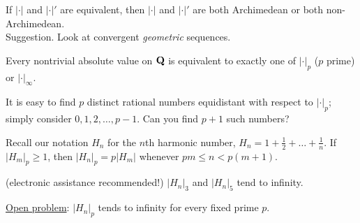 \begin{prob}\label{prob:48} If $|\cdot|$ and $|\cdot|'$ are equivalent, then $|\cdot|$ and $|\cdot|'$ are both Archimedean or both non-Archimedean.\\
{\scriptsize Suggestion. Look at convergent \emph{geometric} sequences.}
\end{prob} 


\begin{prob}\label{prob:49} Every nontrivial absolute value on $\mathbf{Q}$ is equivalent to exactly one of $|\cdot|_p$ ($p$ prime) or $|\cdot|_{\infty}$.
\end{prob} 




\begin{prob}\label{ex:CC}\label{prob:CC} It is easy to find $p$ distinct rational numbers equidistant with respect to $|\cdot|_p$; simply consider $0,1,2,\dots,p-1$. Can you find $p+1$ such numbers? 
\end{prob}




\vspace{-0.15in}
\psh

 \begin{prob}\label{prob:50} Recall our notation $H_n$ for the $n$th harmonic number, $H_n = 1 + \frac12+\dots+\frac1n$.  If $|H_m|_p \ge 1$, then $|H_n|_p = p|H_m|$ whenever $pm \le n < p(m+1)$. 
\end{prob} 

\begin{prob} (electronic assistance recommended!) $|H_n|_{3}$ and $|H_n|_{5}$ tend to infinity.\label{prob:51}

{\scriptsize \underline{Open problem}: $|H_n|_{p}$ tends to infinity for every fixed prime $p$.}
\end{prob}




